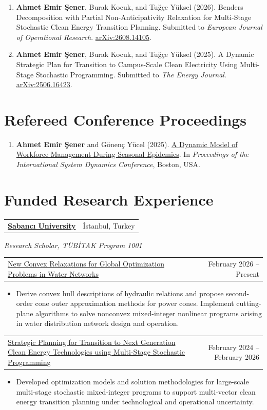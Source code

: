 \documentclass[a4paper,11pt]{article}
\makeatletter
\newcommand{\cvsection}[1]{\Needspace{4\baselineskip}\section*{#1}}
\newcommand{\cvline}[2]{%
  \begin{tabularx}{\linewidth}[t]{@{}>{\raggedright\arraybackslash}X r@{}}%
    #1 & #2 \\
  \end{tabularx}\par
}
\newcommand{\cvheading}[2]{\Needspace{3\baselineskip}\cvline{#1}{#2}}
\newcommand{\entrygap}{\par\vspace{6pt}}
\makeatother
\begin{document}
\begin{enumerate}
  \item \textbf{Ahmet Emir Şener}, Burak Kocuk, and Tuğçe Yüksel (2026).
  Benders Decomposition with Partial Non-Anticipativity Relaxation for Multi-Stage Stochastic Clean Energy Transition Planning.
  Submitted to \textit{European Journal of Operational Research}.
  \href{https://arxiv.org/abs/2608.14105}{arXiv:2608.14105}.

  \item \textbf{Ahmet Emir Şener}, Burak Kocuk, and Tuğçe Yüksel (2025).
  A Dynamic Strategic Plan for Transition to Campus-Scale Clean Electricity Using Multi-Stage Stochastic Programming.
  Submitted to \textit{The Energy Journal}.
  \href{https://arxiv.org/abs/2506.16423}{arXiv:2506.16423}.
\end{enumerate}

\cvsection{Refereed Conference Proceedings}

\begin{enumerate}
  \item \textbf{Ahmet Emir Şener} and Gönenç Yücel (2025).
  \href{https://proceedings.systemdynamics.org/2025/papers/P1188.pdf}{A Dynamic Model of Workforce Management During Seasonal Epidemics}.
  In \textit{Proceedings of the International System Dynamics Conference}, Boston, USA.
\end{enumerate}



\cvsection{Funded Research Experience}

\cvheading{\textbf{\href{https://www.sabanciuniv.edu/}{Sabancı University}}}{İstanbul, Turkey}
\textit{Research Scholar, TÜBİTAK Program 1001}\par

\entrygap
\cvheading{\href{https://sites.google.com/site/burakkocuk/1001waternetwork?authuser=0}{New Convex Relaxations for Global Optimization Problems in Water Networks}}{\hspace{1em}February 2026 -- Present}
\begin{itemize}
  \item Derive convex hull descriptions of hydraulic relations and propose second-order cone outer approximation methods for power cones. Implement cutting-plane algorithms to solve nonconvex mixed-integer nonlinear programs arising in water distribution network design and operation.
\end{itemize}

\entrygap
\cvheading{\href{https://sites.google.com/site/burakkocuk/1001energytransition?authuser=0}{Strategic Planning for Transition to Next Generation Clean Energy Technologies using Multi-Stage Stochastic Programming}}{\hspace{1em}February 2024 -- February 2026}
\begin{itemize}
  \item Developed optimization models and solution methodologies for large-scale multi-stage stochastic mixed-integer programs to support multi-vector clean energy transition planning under technological and operational uncertainty.
\end{itemize}
\end{document}
